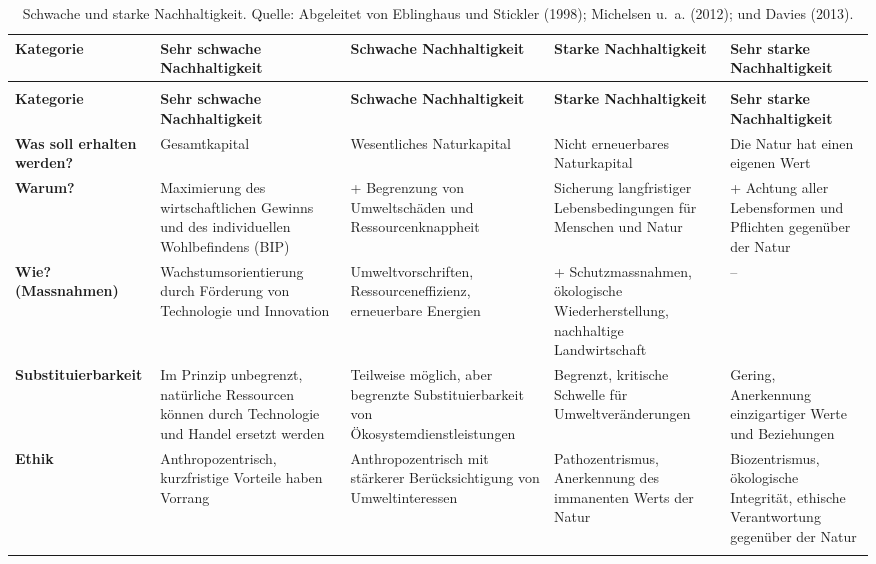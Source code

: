 \documentclass[
  nswissgerman,
  a4paper,
  openany]{book}
\begin{document}
\begin{longtable}[t]{>{\raggedright\arraybackslash}p{1.6cm}>{\raggedright\arraybackslash}p{2.3cm}>{\raggedright\arraybackslash}p{2.3cm}>{\raggedright\arraybackslash}p{2.3cm}>{\raggedright\arraybackslash}p{2.3cm}}

\caption{\label{tbl-weak-strong-sustainability}Schwache und starke
Nachhaltigkeit. Quelle: Abgeleitet von Eblinghaus und Stickler (1998);
{Michelsen u.~a.} (2012); und Davies (2013).}

\tabularnewline

\toprule
\textbf{Kategorie} & \textbf{Sehr schwache Nachhaltigkeit} & \textbf{Schwache Nachhaltigkeit} & \textbf{Starke Nachhaltigkeit} & \textbf{Sehr starke Nachhaltigkeit}\\
\midrule
\endfirsthead
\multicolumn{5}{@{}l}{\textit{(continued)}}\\
\toprule
\textbf{Kategorie} & \textbf{Sehr schwache Nachhaltigkeit} & \textbf{Schwache Nachhaltigkeit} & \textbf{Starke Nachhaltigkeit} & \textbf{Sehr starke Nachhaltigkeit}\\
\midrule
\endhead

\endfoot
\bottomrule
\endlastfoot
\textbf{Was soll erhalten werden?} & Gesamtkapital & Wesentliches Naturkapital & Nicht erneuerbares Naturkapital & Die Natur hat einen eigenen Wert\\
\textbf{Warum?} & Maximierung des wirtschaftlichen Gewinns und des individuellen Wohlbefindens (BIP) & + Begrenzung von Umweltschäden und Ressourcenknappheit & Sicherung langfristiger Lebensbedingungen für Menschen und Natur & + Achtung aller Lebensformen und Pflichten gegenüber der Natur\\
\textbf{Wie? (Massnahmen)} & Wachstumsorientierung durch Förderung von Technologie und Innovation & Umweltvorschriften, Ressourceneffizienz, erneuerbare Energien & + Schutzmassnahmen, ökologische Wiederherstellung, nachhaltige Landwirtschaft & –\\
\textbf{Substituierbarkeit} & Im Prinzip unbegrenzt, natürliche Ressourcen können durch Technologie und Handel ersetzt werden & Teilweise möglich, aber begrenzte Substituierbarkeit von Ökosystemdienstleistungen & Begrenzt, kritische Schwelle für Umweltveränderungen & Gering, Anerkennung einzigartiger Werte und Beziehungen\\
\textbf{Ethik} & Anthropozentrisch, kurzfristige Vorteile haben Vorrang & Anthropozentrisch mit stärkerer Berücksichtigung von Umweltinteressen & Pathozentrismus, Anerkennung des immanenten Werts der Natur & Biozentrismus, ökologische Integrität, ethische Verantwortung gegenüber der Natur\\*

\end{longtable}
\end{document}
